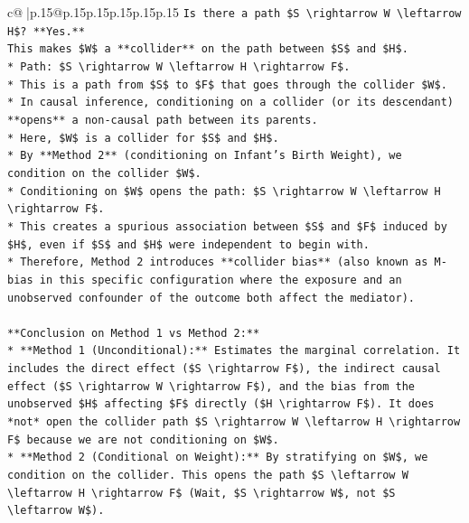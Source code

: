 \documentclass{article}
\begin{document}
{\begin{supertabular}{c@{$\;$}|p{.15\linewidth}@{}p{.15\linewidth}p{.15\linewidth}p{.15\linewidth}p{.15\linewidth}p{.15\linewidth}}
{{{\texttt{Is there a path \$S \textbackslash{}rightarrow W \textbackslash{}leftarrow H\$? **Yes.**} \\
\texttt{This makes \$W\$ a **collider** on the path between \$S\$ and \$H\$.} \\
\texttt{*   Path: \$S \textbackslash{}rightarrow W \textbackslash{}leftarrow H \textbackslash{}rightarrow F\$.} \\
\texttt{*   This is a path from \$S\$ to \$F\$ that goes through the collider \$W\$.} \\
\texttt{*   In causal inference, conditioning on a collider (or its descendant) **opens** a non{-}causal path between its parents.} \\
\texttt{*   Here, \$W\$ is a collider for \$S\$ and \$H\$.} \\
\texttt{*   By **Method 2** (conditioning on Infant's Birth Weight), we condition on the collider \$W\$.} \\
\texttt{*   Conditioning on \$W\$ opens the path: \$S \textbackslash{}rightarrow W \textbackslash{}leftarrow H \textbackslash{}rightarrow F\$.} \\
\texttt{*   This creates a spurious association between \$S\$ and \$F\$ induced by \$H\$, even if \$S\$ and \$H\$ were independent to begin with.} \\
\texttt{*   Therefore, Method 2 introduces **collider bias** (also known as M{-}bias in this specific configuration where the exposure and an unobserved confounder of the outcome both affect the mediator).} \\
\\ 
\texttt{**Conclusion on Method 1 vs Method 2:**} \\
\texttt{*   **Method 1 (Unconditional):** Estimates the marginal correlation. It includes the direct effect (\$S \textbackslash{}rightarrow F\$), the indirect causal effect (\$S \textbackslash{}rightarrow W \textbackslash{}rightarrow F\$), and the bias from the unobserved \$H\$ affecting \$F\$ directly (\$H \textbackslash{}rightarrow F\$). It does *not* open the collider path \$S \textbackslash{}rightarrow W \textbackslash{}leftarrow H \textbackslash{}rightarrow F\$ because we are not conditioning on \$W\$.} \\
\texttt{*   **Method 2 (Conditional on Weight):** By stratifying on \$W\$, we condition on the collider. This opens the path \$S \textbackslash{}leftarrow W \textbackslash{}leftarrow H \textbackslash{}rightarrow F\$ (Wait, \$S \textbackslash{}rightarrow W\$, not \$S \textbackslash{}leftarrow W\$).} \\
}}}
\end{supertabular}}
\end{document}

